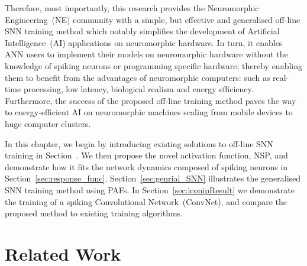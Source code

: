 Therefore, most importantly, this research provides the Neuromorphic Engineering~(NE) community with a simple, but effective and generalised off-line SNN training method which notably simplifies the development of Artificial Intelligence~(AI) applications on neuromorphic hardware.
In turn, it enables ANN users to implement their models on neuromorphic hardware without the knowledge of spiking neurons or programming specific hardware;
thereby enabling them to benefit from the advantages of neuromorphic computers: such as real-time processing, low latency, biological realism and energy efficiency.
Furthermore, the success of the proposed off-line training method paves the way to energy-efficient AI on neuromorphic machines scaling from mobile devices to huge computer clusters.



In this chapter, we begin by introducing existing solutions to off-line SNN training in Section~\DIFdelbegin \DIFdel{\ref{sec:intro_NSP}}\DIFdelend \DIFaddbegin \DIFadd{\ref{sec:NSP_relate}}\DIFaddend .
We then propose the novel activation function, NSP, and demonstrate how it fits the network dynamics composed of spiking neurons in Section~\ref{sec:response_func}.
Section~\ref{sec:genrial_SNN} illustrates the generalised SNN training method using PAFs.
In Section~\ref{sec:iconipResult} we demonstrate the training of a spiking Convolutional Network~(ConvNet), and compare the proposed method to existing training algorithms.

\section{Related Work}
\label{sec:NSP_relate}

